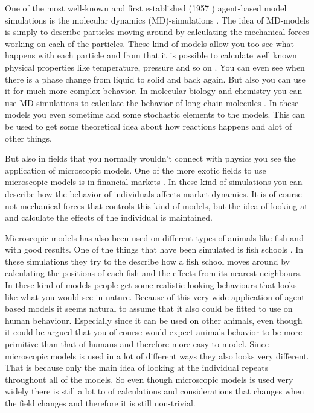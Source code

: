 One of the most well-known and first established (1957 \cite{MDintro}) 
agent-based model simulations is the molecular dynamics (MD)-simulations 
\cite{MDintro}. The idea of MD-models is simply to describe particles moving 
around by calculating the mechanical forces working on each of the particles.  
These kind of models allow you too see what happens with each particle and from 
that it is possible to calculate well known physical properties like 
temperature, pressure and so on . You can even see when there is a phase 
change from liquid to solid and back again. But also you can use it for much 
more complex behavior. In molecular biology and chemistry you can use 
MD-simulations to calculate the behavior of long-chain molecules \cite{MDbio}.  
In these models you even sometime add some stochastic elements to the models.  
This can be used to get some theoretical idea about how reactions happens and 
alot of other things.

But also in fields that you normally wouldn't connect with physics you see the 
application of microscopic models.
One of the more exotic fields to use microscopic models is in financial 
markets \cite{finans}.  In these kind of simulations you can describe how the 
behavior of individuals affects market dynamics.  It is of course not 
mechanical forces that controls this kind of models, but the idea of looking 
at and calculate the effects of the individual is maintained. 

Microscopic models has also been used on different types of animals like fish 
and with good results.  One of the things that have been simulated is fish 
schools \cite{fish}. In these simulations they try to the describe how a fish 
school moves around by calculating the positions of each fish and the effects 
from its nearest neighbours. In these kind of models people get some realistic  
looking behaviours that looks like what you would see in nature. Because of 
this very wide application of agent based models it seems natural to assume 
that it also could be fitted to use on human behaviour. Especially since it can 
be used on other animals, even though it could be argued that you of course 
would expect animals behavior to be more primitive than that of humans and 
therefore more easy to model.  Since microscopic models is used in a lot of 
different ways they also looks very different. That is because only the main 
idea of looking at the individual repeats throughout all of the models. So even 
though microscopic models is used very widely there is still a lot to of 
calculations and considerations that changes when the field changes and 
therefore it is still non-trivial.

